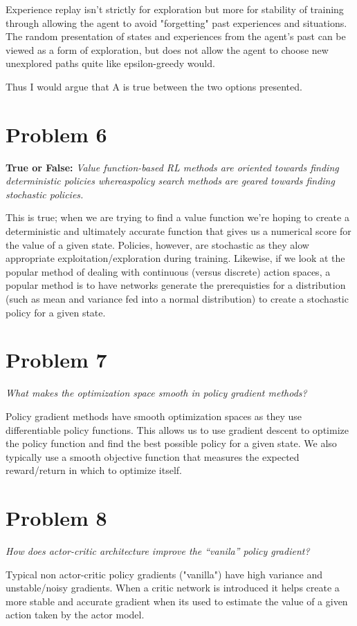 \documentclass{article}
\begin{document}
Experience replay isn't strictly for exploration but more for stability of training through allowing the agent to avoid "forgetting" past experiences and situations. The random presentation of states and experiences from the agent's past can be viewed as a form of exploration, but does not allow the agent to choose new unexplored paths quite like epsilon-greedy would.

Thus I would argue that A is true between the two options presented.

\section*{Problem 6}
\textbf{True or False:} \textit{Value function-based RL methods are oriented towards finding deterministic policies whereaspolicy search methods are geared towards finding stochastic policies.}

This is true; when we are trying to find a value function we're hoping to create a deterministic and ultimately accurate function that gives us a numerical score for the value of a given state. Policies, however, are stochastic as they alow appropriate exploitation/exploration during training. Likewise, if we look at the popular method of dealing with continuous (versus discrete) action spaces, a popular method is to have networks generate the prerequisties for a distribution (such as mean and variance fed into a normal distribution) to create a stochastic policy for a given state.

\section*{Problem 7}
\textit{What makes the optimization space smooth in policy gradient methods?}

Policy gradient methods have smooth optimization spaces as they use differentiable policy functions. This allows us to use gradient descent to optimize the policy function and find the best possible policy for a given state. We also typically use a smooth objective function that measures the expected reward/return in which to optimize itself.

\section*{Problem 8}
\textit{How does actor-critic architecture improve the “vanila” policy gradient?}

Typical non actor-critic policy gradients ("vanilla") have high variance and unstable/noisy gradients. When a critic network is introduced it helps create a more stable and accurate gradient when its used to estimate the value of a given action taken by the actor model.
\end{document}
